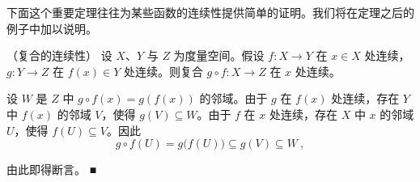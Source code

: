 下面这个重要定理往往为某些函数的连续性提供简单的证明。我们将在定理之后的例子中加以说明。

\begin{theorem}

（复合的连续性） 设 $X$、$Y$ 与 $Z$ 为度量空间。假设 $f: X \to Y$ 在 $x \in X$ 处连续，$g: Y \to Z$ 在 $f(x) \in Y$ 处连续。则复合 $g \circ f: X \to Z$ 在 $x$ 处连续。

\proofhead
设 $W$ 是 $Z$ 中 $g \circ f(x) = g(f(x))$ 的邻域。由于 $g$ 在 $f(x)$ 处连续，存在 $Y$ 中 $f(x)$ 的邻域 $V$，使得 $g(V) \subseteq W$。由于 $f$ 在 $x$ 处连续，存在 $X$ 中 $x$ 的邻域 $U$，使得 $f(U) \subseteq V$。因此
\[
g\circ f(U)=g\bigl(f(U)\bigr)\subseteq g(V)\subseteq W~,
\]

由此即得断言。 ■

\end{theorem}

